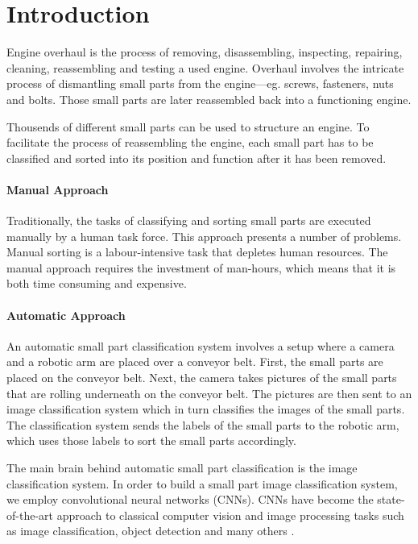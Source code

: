 \chapter{Introduction}

Engine overhaul is the process of removing, disassembling, inspecting, repairing, cleaning, reassembling and testing a used engine. Overhaul involves the intricate process of dismantling small parts from the engine—eg. screws, fasteners, nuts and bolts. Those small parts are later reassembled back into a functioning engine.

Thousends of different small parts can be used to structure an engine. To facilitate the process of reassembling the engine, each small part has to be classified and sorted into its position and function after it has been removed.

\subsubsection{Manual Approach}

Traditionally, the tasks of classifying and sorting small parts are executed manually by a human task force. This approach presents a number of problems. Manual sorting is a labour-intensive task that depletes human resources. The manual approach requires the investment of man-hours, which means that it is both time consuming and expensive.

\subsubsection{Automatic Approach}

An automatic small part classification system involves a setup where a camera and a robotic arm are placed over a conveyor belt. First, the small parts are placed on the conveyor belt. Next, the camera takes pictures of the small parts that are rolling underneath on the conveyor belt. The pictures are then sent to an image classification system which in turn classifies the images of the small parts. The classification system sends the labels of the small parts to the robotic arm, which uses those labels to sort the small parts accordingly.

The main brain behind automatic small part classification is the image classification system. In order to build a small part image classification system, we employ convolutional neural networks (CNNs). CNNs have become the state-of-the-art approach to classical computer vision and image processing tasks such as image classification, object detection and many others \cite{krizhevsky2012imagenet} \cite{szegedy2015going}.

